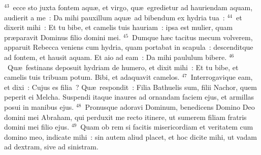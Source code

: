 ${}^{43}$~ecce sto juxta fontem aqu\ae , et virgo, qu\ae\ egredietur ad hauriendam aquam, audierit a me~: Da mihi pauxillum aqu\ae\ ad bibendum ex hydria tua~:
${}^{44}$~et dixerit mihi~: Et tu bibe, et camelis tuis hauriam~: ipsa est mulier, quam pr\ae paravit Dominus filio domini mei.
${}^{45}$~Dumque h\ae c tacitus mecum volverem, apparuit Rebecca veniens cum hydria, quam portabat in scapula~: descenditque ad fontem, et hausit aquam. Et aio ad eam~: Da mihi paululum bibere.
${}^{46}$~Qu\ae\ festinans deposuit hydriam de humero, et dixit mihi~: Et tu bibe, et camelis tuis tribuam potum. Bibi, et adaquavit camelos.
${}^{47}$~Interrogavique eam, et dixi~: Cujus es filia~? Qu\ae\ respondit~: Filia Bathuelis sum, filii Nachor, quem peperit ei Melcha. Suspendi itaque inaures ad ornandam faciem ejus, et armillas posui in manibus ejus.
${}^{48}$~Pronusque adoravi Dominum, benedicens Domino Deo domini mei Abraham, qui perduxit me recto itinere, ut sumerem filiam fratris domini mei filio ejus.
${}^{49}$~Quam ob rem si facitis misericordiam et veritatem cum domino meo, indicate mihi~: sin autem aliud placet, et hoc dicite mihi, ut vadam ad dextram, sive ad sinistram.


